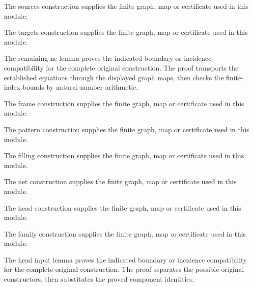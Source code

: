 The sources construction supplies the finite graph, map or certificate used in this module.
\par{}

The targets construction supplies the finite graph, map or certificate used in this module.
\par{}

The remaining ne lemma proves the indicated boundary or incidence compatibility for the complete original construction.
The proof transports the established equations through the displayed graph maps, then checks the finite-index bounds by natural-number arithmetic.
\par{}

The frame construction supplies the finite graph, map or certificate used in this module.
\par{}

The pattern construction supplies the finite graph, map or certificate used in this module.
\par{}

The filling construction supplies the finite graph, map or certificate used in this module.
\par{}

The net construction supplies the finite graph, map or certificate used in this module.
\par{}

The head construction supplies the finite graph, map or certificate used in this module.
\par{}

The family construction supplies the finite graph, map or certificate used in this module.
\par{}

The head input lemma proves the indicated boundary or incidence compatibility for the complete original construction.
The proof separates the possible original constructors, then substitutes the proved component identities.
\par{}

